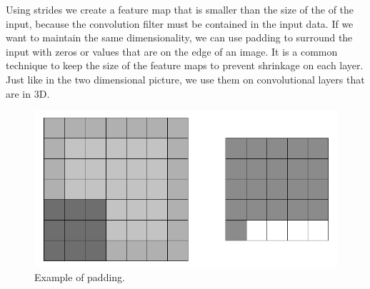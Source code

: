 \documentclass[conference]{IEEEtran}
\begin{document}
Using strides we create a feature map that is smaller than the size of the of the input, because the convolution filter must be contained in the input data. If we want to maintain the same dimensionality, we can use padding to surround the input with zeros or values that are on the edge of an image. It is a common technique to keep the size of the feature maps to prevent shrinkage on each layer. Just like in the two dimensional picture, we use them on convolutional layers that are in 3D.

\begin{figure}[hbt!]
 \centering
    \includegraphics[scale=0.36]{padding-b.png}
	    \caption{Example of padding.}
	    \label{fig:my_label}
\end{figure}
\end{document}
